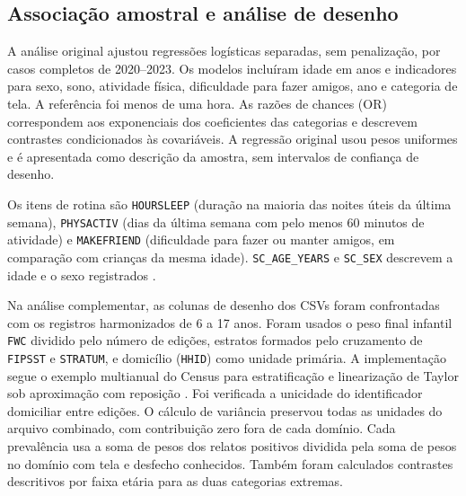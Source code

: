 ﻿\documentclass[12pt]{article}
\begin{document}
\subsection{Associação amostral e análise de desenho}
A análise original ajustou regressões logísticas separadas, sem penalização, por casos completos de 2020--2023. Os modelos incluíram idade em anos e indicadores para sexo, sono, atividade física, dificuldade para fazer amigos, ano e categoria de tela. A referência foi menos de uma hora. As razões de chances (OR) correspondem aos exponenciais dos coeficientes das categorias e descrevem contrastes condicionados às covariáveis. A regressão original usou pesos uniformes e é apresentada como descrição da amostra, sem intervalos de confiança de desenho.

Os itens de rotina são \texttt{HOURSLEEP} (duração na maioria das noites úteis da última semana), \texttt{PHYSACTIV} (dias da última semana com pelo menos 60 minutos de atividade) e \texttt{MAKEFRIEND} (dificuldade para fazer ou manter amigos, em comparação com crianças da mesma idade). \texttt{SC\_AGE\_YEARS} e \texttt{SC\_SEX} descrevem a idade e o sexo registrados \cite{census2024}.

Na análise complementar, as colunas de desenho dos CSVs foram confrontadas com os registros harmonizados de 6 a 17 anos. Foram usados o peso final infantil \texttt{FWC} dividido pelo número de edições, estratos formados pelo cruzamento de \texttt{FIPSST} e \texttt{STRATUM}, e domicílio (\texttt{HHID}) como unidade primária. A implementação segue o exemplo multianual do Census para estratificação e linearização de Taylor sob aproximação com reposição \cite{censusguide,censusaccuracy2024,lumley2004}. Foi verificada a unicidade do identificador domiciliar entre edições. O cálculo de variância preservou todas as unidades do arquivo combinado, com contribuição zero fora de cada domínio. Cada prevalência usa a soma de pesos dos relatos positivos dividida pela soma de pesos no domínio com tela e desfecho conhecidos. Também foram calculados contrastes descritivos por faixa etária para as duas categorias extremas.
\end{document}
